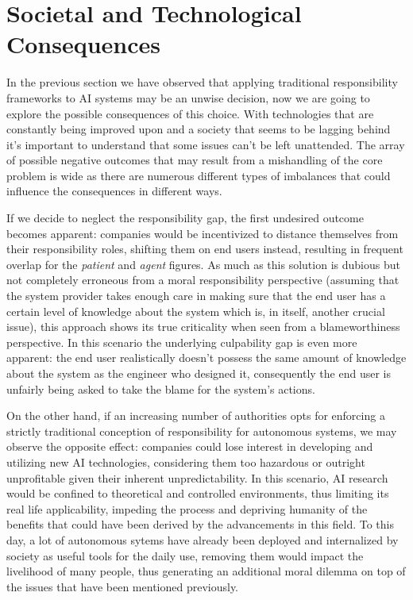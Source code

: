 \section{Societal and Technological Consequences}\label{sec:consequences}

In the previous section we have observed that applying traditional responsibility frameworks to AI systems may be an unwise decision, now we are going to explore the possible consequences of this choice.
With technologies that are constantly being improved upon and a society that seems to be lagging behind it's important to understand that some issues can't be left unattended.
The array of possible negative outcomes that may result from a mishandling of the core problem is wide as there are numerous different types of imbalances that could influence the consequences in different ways.

If we decide to neglect the responsibility gap, the first undesired outcome becomes apparent: companies would be incentivized to distance themselves from their responsibility roles, shifting them on end users instead, resulting in frequent overlap for the \textit{patient} and \textit{agent} figures.
As much as this solution is dubious but not completely erroneous from a moral responsibility perspective (assuming that the system provider takes enough care in making sure that the end user has a certain level of knowledge about the system which is, in itself, another crucial issue), this approach shows its true criticality when seen from a blameworthiness perspective.
In this scenario the underlying culpability gap \parencite{SANFRG} is even more apparent: the end user realistically doesn't possess the same amount of knowledge about the system as the engineer who designed it, consequently the end user is unfairly being asked to take the blame for the system's actions.

On the other hand, if an increasing number of authorities opts for enforcing a strictly traditional conception of responsibility for autonomous systems, we may observe the opposite effect: companies could lose interest in developing and utilizing new AI technologies, considering them too hazardous or outright unprofitable given their inherent unpredictability.
In this scenario, AI research would be confined to theoretical and controlled environments, thus limiting its real life applicability, impeding the process and depriving humanity of the benefits that could have been derived by the advancements in this field.
To this day, a lot of autonomous sytems have already been deployed and internalized by society as useful tools for the daily use, removing them would impact the livelihood of many people, thus generating an additional moral dilemma on top of the issues that have been mentioned previously.
